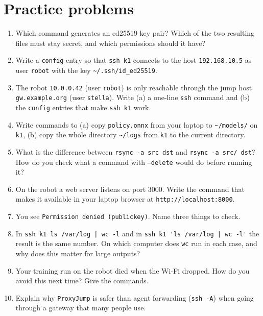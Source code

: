\section*{Practice problems}
\begin{enumerate}[label=\textbf{\thechapter.\arabic*}]
  \item Which command generates an ed25519 key pair? Which of the two resulting files must stay secret, and which permissions should it have?
  \item Write a \texttt{config} entry so that \verb|ssh k1| connects to the host \texttt{192.168.10.5} as user \texttt{robot} with the key \texttt{\textasciitilde/.ssh/id\_ed25519}.
  \item The robot \texttt{10.0.0.42} (user \texttt{robot}) is only reachable through the jump host \texttt{gw.example.org} (user \texttt{stella}). Write (a) a one-line \texttt{ssh} command and (b) the \texttt{config} entries that make \verb|ssh k1| work.
  \item Write commands to (a) copy \texttt{policy.onnx} from your laptop to \texttt{\textasciitilde/models/} on \texttt{k1}, (b) copy the whole directory \texttt{\textasciitilde/logs} from \texttt{k1} to the current directory.
  \item What is the difference between \verb|rsync -a src dst| and \verb|rsync -a src/ dst|? How do you check what a command with \texttt{--delete} would do before running it?
  \item On the robot a web server listens on port $3000$. Write the command that makes it available in your laptop browser at \texttt{http://localhost:8000}.
  \item You see \texttt{Permission denied (publickey)}. Name three things to check.
  \item In \verb!ssh k1 ls /var/log | wc -l! and in \verb!ssh k1 'ls /var/log | wc -l'! the result is the same number. On which computer does \texttt{wc} run in each case, and why does this matter for large outputs?
  \item Your training run on the robot died when the Wi-Fi dropped. How do you avoid this next time? Give the commands.
  \item[\textbf{\thechapter.10}$\star$] Explain why \texttt{ProxyJump} is safer than agent forwarding (\texttt{ssh -A}) when going through a gateway that many people use.
\end{enumerate}
